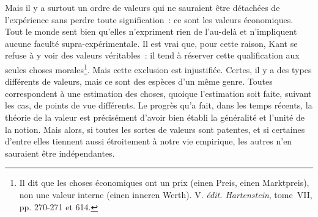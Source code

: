 \documentclass[french,twoside]{book} %
\begin{document}
Mais il y a surtout un ordre de valeurs qui ne sauraient être détachées de l’expérience sans perdre toute signification : ce sont les valeurs économiques. Tout le monde sent bien qu’elles n’expriment rien de l’au-delà et n’impliquent aucune faculté supra-expérimentale. Il est vrai que, pour cette raison, Kant se refuse à y voir des valeurs véritables : il tend à réserver cette qualification aux seules choses morales\footnote{ Il dit que les choses économiques ont un prix (einen Preis, einen Marktpreis), non une valeur interne (einen inneren Werth). V. {\itshape édit. Hartenstein}, tome VII, pp. 270-271 et 614.}. Mais cette exclusion est injustifiée. Certes, il y a des types différents de valeurs, mais ce sont des espèces d’un même genre. Toutes correspondent à une estimation des choses, quoique l’estimation soit faite, suivant les cas, de points de vue différents. Le progrès qu’a fait, dans les temps récents, la théorie de la valeur est précisément d’avoir bien établi la généralité et l’unité de la notion. Mais alors, si toutes les sortes de valeurs sont patentes, et si certaines d’entre elles tiennent aussi étroitement à notre vie empirique, les autres n’en sauraient être indépendantes.
\end{document}
